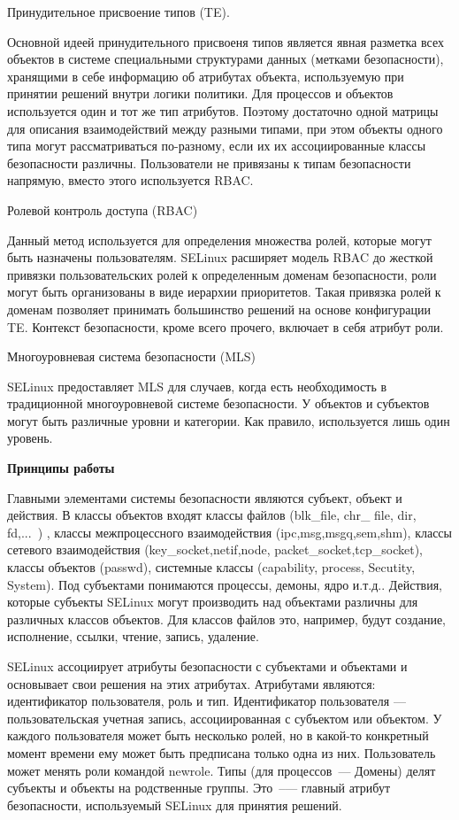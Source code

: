 \bigskip
Принудительное присвоение типов (TE). 

Основной идеей принудительного присвоеня
типов является явная разметка всех объектов 
в системе специальными структурами данных 
(метками безопасности), хранящими в себе информацию
об атрибутах объекта, используемую при принятии 
решений внутри логики политики. 
Для процессов и объектов используется 
один и тот же тип атрибутов. Поэтому достаточно 
одной матрицы для описания взаимодействий между 
разными типами, при этом объекты одного типа могут 
рассматриваться по-разному, если их их ассоциированные 
классы безопасности различны. Пользователи не 
привязаны к типам безопасности напрямую, вместо 
этого используется RBAC.

\bigskip
Ролевой контроль доступа (RBAC) 

Данный метод используется для определения 
множества ролей, которые могут 
быть назначены пользователям. SELinux расширяет 
модель RBAC до жесткой привязки пользовательских 
ролей к определенным доменам безопасности, роли 
могут быть организованы в виде иерархии приоритетов. 
Такая привязка ролей к доменам позволяет принимать 
большинство решений на основе конфигурации TE. 
Контекст безопасности, кроме всего прочего, включает 
в себя атрибут роли.

\bigskip
Многоуровневая система безопасности (MLS) 

SELinux предоставляет MLS для случаев, когда есть 
необходимость в традиционной многоуровневой системе 
безопасности. У объектов и субъектов могут быть 
различные уровни и категории. 
Как правило, используется лишь один уровень. 

\bigskip
{\bfseries Принципы работы}

Главными элементами системы безопасности 
являются субъект, объект и действия. В классы 
объектов входят классы файлов (blk\_file, chr\_
file, dir, fd,...\ ) ,  классы межпроцессного 
взаимодействия (ipc,msg,msgq,sem,shm), классы 
сетевого взаимодействия (key\_socket,netif,node,
packet\_socket,tcp\_socket), классы объектов 
(passwd), системные классы (capability, process,
Secutity, System). Под субъектами понимаются 
процессы, демоны, ядро и.т.д.. Действия, которые субъекты 
SELinux могут производить над объектами 
различны для различных классов объектов. 
Для классов файлов это, например, 
будут создание, исполнение, ссылки, чтение, запись, 
удаление. 

SELinux ассоциирует атрибуты безопасности 
с субъектами и объектами и основывает свои решения 
на этих атрибутах. Атрибутами являются: идентификатор 
пользователя, роль и тип. Идентификатор пользователя 
— пользовательская учетная запись, ассоциированная с 
субъектом или объектом. У каждого пользователя может 
быть несколько ролей, но в какой-то конкретный момент
времени ему может быть предписана только одна из них. 
Пользователь может менять роли командой newrole. Типы 
(для процессов~--- Домены) делят субъекты и объекты на родственные 
группы. Это~--— главный атрибут безопасности, используемый 
SELinux для принятия решений. 

